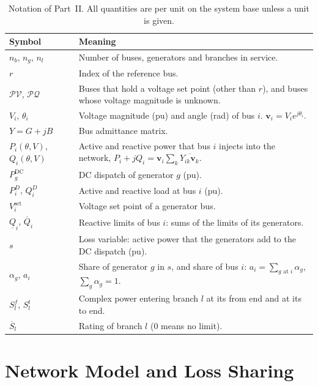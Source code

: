 \documentclass[a4paper,11pt]{article}
\begin{document}
\begin{table}[H]\centering\small
\begin{tabular}{@{}lp{12cm}@{}}
\toprule
\textbf{Symbol} & \textbf{Meaning} \\
\midrule
$n_b$, $n_g$, $n_l$ & Number of buses, generators and branches in service. \\
$r$ & Index of the reference bus. \\
$\mathcal{PV}$, $\mathcal{PQ}$ & Buses that hold a voltage set point (other than $r$), and buses whose voltage magnitude is unknown. \\
$V_i$, $\theta_i$ & Voltage magnitude (pu) and angle (rad) of bus $i$. $\mathbf{v}_i = V_i e^{j\theta_i}$. \\
$Y=G+jB$ & Bus admittance matrix. \\
$P_i(\theta,V)$, $Q_i(\theta,V)$ & Active and reactive power that bus $i$ injects into the network, $P_i + jQ_i = \mathbf{v}_i \sum_k \overline{Y_{ik}\mathbf{v}_k}$. \\
$P^{\mathrm{DC}}_g$ & DC dispatch of generator $g$ (pu). \\
$P^D_i$, $Q^D_i$ & Active and reactive load at bus $i$ (pu). \\
$V^{\mathrm{set}}_i$ & Voltage set point of a generator bus. \\
$\underline{Q}_i$, $\overline{Q}_i$ & Reactive limits of bus $i$: sums of the limits of its generators. \\
$s$ & Loss variable: active power that the generators add to the DC dispatch (pu). \\
$\alpha_g$, $a_i$ & Share of generator $g$ in $s$, and share of bus $i$: $a_i=\sum_{g \text{ at } i}\alpha_g$, $\sum_g\alpha_g=1$. \\
$S^f_l$, $S^t_l$ & Complex power entering branch $l$ at its from end and at its to end. \\
$\overline{S}_l$ & Rating of branch $l$ (0 means no limit). \\
\bottomrule
\end{tabular}
\caption{Notation of Part~II. All quantities are per unit on the system base unless a unit is given.}
\end{table}

\section{Network Model and Loss Sharing}\label{sec:model}
\end{document}
